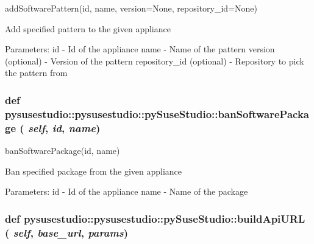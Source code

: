 \label{classpysusestudio_1_1pysusestudio_1_1py_suse_studio_a4841d8303b24923a3be7de04e07c82c7}
\begin{DoxyVerb}addSoftwarePattern(id, name, version=None, repository_id=None)

            Add specified pattern to the given appliance
            
            Parameters:
id - Id of the appliance
name - Name of the pattern
version (optional) - Version of the pattern
repository_id (optional) - Repository to pick the pattern from

\end{DoxyVerb}
 \hypertarget{classpysusestudio_1_1pysusestudio_1_1py_suse_studio_ae3a78d2d3b2d138a38cbd0360e502699}{
\subsubsection[{banSoftwarePackage}]{\setlength{\rightskip}{0pt plus 5cm}def pysusestudio::pysusestudio::pySuseStudio::banSoftwarePackage ( {\em self}, \/   {\em id}, \/   {\em name})}}
\label{classpysusestudio_1_1pysusestudio_1_1py_suse_studio_ae3a78d2d3b2d138a38cbd0360e502699}
\begin{DoxyVerb}banSoftwarePackage(id, name)

            Ban specified package from the given appliance
            
            Parameters:
id - Id of the appliance
name - Name of the package

\end{DoxyVerb}
 \hypertarget{classpysusestudio_1_1pysusestudio_1_1py_suse_studio_ac4edfb6464e00e862c286e666a475d1e}{
\subsubsection[{buildApiURL}]{\setlength{\rightskip}{0pt plus 5cm}def pysusestudio::pysusestudio::pySuseStudio::buildApiURL ( {\em self}, \/   {\em base\_\-url}, \/   {\em params})}}
\label{classpysusestudio_1_1pysusestudio_1_1py_suse_studio_ac4edfb6464e00e862c286e666a475d1e}
